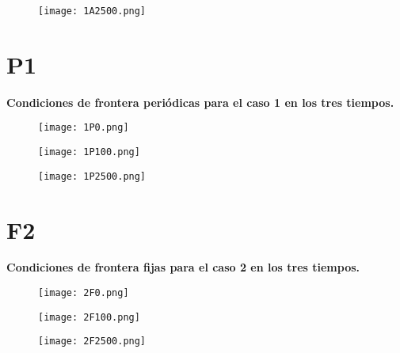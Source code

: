 \documentclass[12pt,letterpaper]{article}
\begin{document}
\begin{figure}[H]
\texttt{[image: 1A2500.png]}
\centering
\end{figure}



\section{P1}
\vspace{0.2cm}

\begin{center}
{\textbf{Condiciones de frontera periódicas para el caso 1 en los tres tiempos.}}\\
\vspace{0.2cm}
\end{center}

\begin{figure}[H]
\texttt{[image: 1P0.png]}
\centering
\end{figure}

\begin{figure}[H]
\texttt{[image: 1P100.png]}
\centering
\end{figure}

\begin{figure}[H]
\texttt{[image: 1P2500.png]}
\centering
\end{figure}



\section{F2}
\vspace{0.2cm}

\begin{center}
{\textbf{Condiciones de frontera fijas para el caso 2 en los tres tiempos.}}\\
\vspace{0.2cm}
\end{center}


\begin{figure}[H]
\texttt{[image: 2F0.png]}
\centering
\end{figure}

\begin{figure}[H]
\texttt{[image: 2F100.png]}
\centering
\end{figure}

\begin{figure}[H]
\texttt{[image: 2F2500.png]}
\centering
\end{figure}
\end{document}
